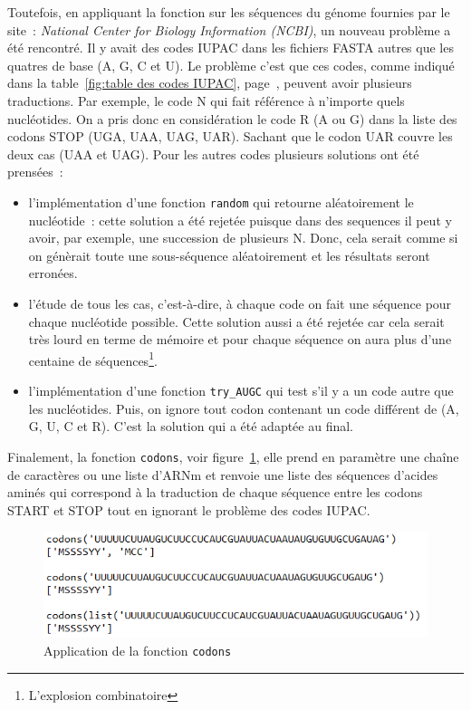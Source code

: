\documentclass[12pt]{article}
\begin{document}
Toutefois, en appliquant la fonction sur les séquences du génome fournies par le site~: 
\textsl{National Center for Biology Information (NCBI)}, un nouveau problème a été rencontré. Il y avait des codes IUPAC dans les fichiers FASTA autres que les quatres de base (A, G, C et U). Le problème c'est que ces codes, comme indiqué dans la table~\ref{fig:table des codes IUPAC}, page~\pageref{fig:table des codes IUPAC}, peuvent avoir plusieurs traductions. Par exemple, le code N qui fait référence à n'importe quels nucléotides. On a pris donc en considération le code R (A ou G) dans la liste des codons STOP (UGA, UAA, UAG, UAR). Sachant que le codon UAR couvre les deux cas (UAA et UAG). 
Pour les autres codes plusieurs solutions ont été prensées~:
\begin{itemize}
\item l'implémentation d'une fonction \texttt{random} qui retourne aléatoirement le nucléotide~: cette solution a été rejetée puisque dans des sequences il peut y avoir, par exemple, une succession de plusieurs N. Donc, cela serait comme si on génèrait toute une sous-séquence aléatoirement et les résultats seront erronées.
\item l'étude de tous les cas, c'est-à-dire, à chaque code on fait une séquence pour chaque nucléotide possible. Cette solution aussi a été rejetée car cela serait très lourd en terme de mémoire et pour chaque séquence on aura plus d'une centaine de séquences\footnote{L'explosion combinatoire}.
\item l'implémentation d'une fonction \texttt{try\_AUGC} qui test s'il y a un code autre que les nucléotides. Puis, on ignore tout codon contenant un code différent de (A, G, U, C et R). C'est la solution qui a été adaptée au final. 
\end{itemize}

Finalement, la fonction \texttt{codons}, voir figure~\ref{fig: fctCodons}, elle prend en paramètre une chaîne de caractères ou une liste d'ARNm et renvoie une liste des séquences d'acides aminés qui correspond à la traduction de chaque séquence entre les codons START et STOP tout en ignorant le problème des codes IUPAC. 

     \begin{figure}[!h]
        \centering
        \includegraphics[scale = 1.2]{Images/Codons/app_codons.png}
        \caption{Application de la fonction \texttt{codons} }
        \label{fig: fctCodons}
    \end{figure}
\end{document}
